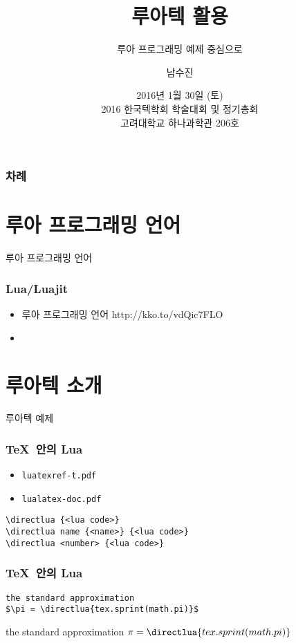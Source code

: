 \documentclass{beamer}
\title{루아텍 활용}
\subtitle{루아 프로그래밍 예제 중심으로}
\author{남수진}
\date{ 2016년 1월 30일 (토)\\
  2016 한국텍학회 학술대회 및 정기총회 \\
  {\small 고려대학교 하나과학관 206호}}
\begin{document}
\begin{frame}
  \titlepage
\end{frame}

\begin{frame}[t]
  \frametitle{차례}
  \tableofcontents
\end{frame}

%
\section{루아 프로그래밍 언어}

\begin{frame}
  \huge
  \centering 루아 프로그래밍 언어
\end{frame}

\begin{frame}
  \frametitle{Lua/Luajit}
  \begin{itemize}
  \item 루아 프로그래밍 언어 http://kko.to/vdQic7FLO
  \item
  \end{itemize}
\end{frame}


%
\section{루아텍 소개}

\begin{frame}
  \huge
  \centering 루아텍 예제
\end{frame}

\begin{frame}[fragile]
  \frametitle{\TeX\ 안의 Lua}
  \begin{itemize}
  \item \texttt{luatexref-t.pdf}
  \item \texttt{lualatex-doc.pdf}
  \end{itemize}
  \Large
\begin{verbatim}
\directlua {<lua code>}
\directlua name {<name>} {<lua code>}
\directlua <number> {<lua code>}
\end{verbatim}
\end{frame}

\begin{frame}[fragile]
  \frametitle{\TeX\ 안의 Lua}
\begin{verbatim}
the standard approximation 
$\pi = \directlua{tex.sprint(math.pi)}$
\end{verbatim}
\begin{center}
  the standard approximation $\pi = \directlua{tex.sprint(math.pi)}$
\end{center}
\end{frame}
\end{document}
